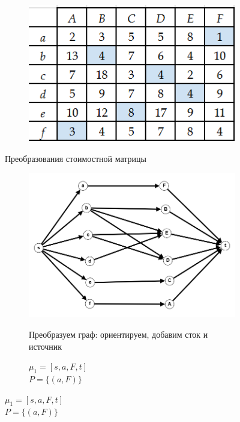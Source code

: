 \documentclass{article}
\begin{document}
\begin{enumerate}
\begin{figure}[ht]
\begin{subfigure}[b]{0.3\textwidth}
         \includegraphics[width=\textwidth]{attachments/10/05.png}
         \label{fig:10_05}
     \end{subfigure}
    \caption{Преобразования стоимостной матрицы}
    \label{fig:10_matrix_changes}
\end{figure}
\begin{figure}
     \centering
     \begin{subfigure}[t]{0.32\textwidth}
        \centering
         \caption*{\small{Преобразуем граф: ориентируем, добавим сток и источник}}
         \includegraphics[width=\textwidth]{attachments/10/0.png}
         \label{fig:10_0}
     \end{subfigure}
     \hfill
     \begin{subfigure}[t]{0.32\textwidth}
        \centering
         \caption*{\small{$\mu_1 = [s, a, F, t]$\\$P =\{(a,F)\}$}}

\end{subfigure}
\end{figure}
\end{enumerate}
\end{document}
